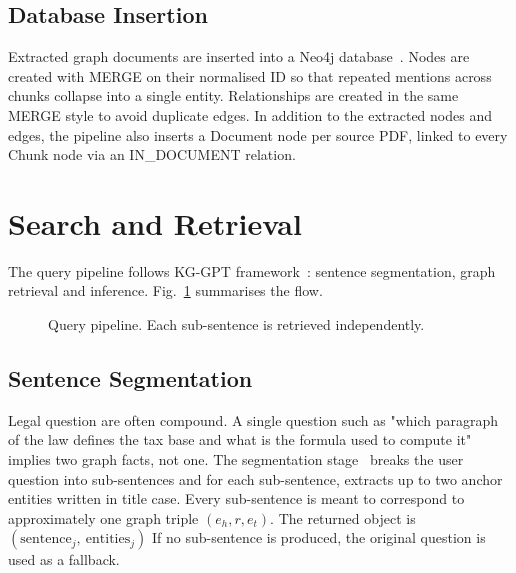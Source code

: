 \documentclass[conference]{IEEEtran}
\begin{document}
\subsection{Database Insertion}
Extracted graph documents are inserted into a {Neo4j database}~\cite{b3}. Nodes are created with MERGE on their normalised ID so that repeated mentions across chunks collapse into a single entity. Relationships are created in the same MERGE style to avoid duplicate edges. In addition to the extracted nodes and edges, the pipeline also inserts a Document node per source PDF, linked to every Chunk node via an IN\_DOCUMENT relation.

\section{Search and Retrieval}
The query pipeline follows {KG-GPT framework}~\cite{kggpt2023}: sentence segmentation, graph retrieval and inference. Fig.~\ref{fig:qeury} summarises the flow.

\begin{figure}[h]
\centering
  \caption{Query pipeline. Each sub-sentence is retrieved independently.}
\label{fig:qeury}
\end{figure}

\subsection{Sentence Segmentation}
Legal question are often compound. A single question such as "which paragraph of the law defines the tax base and what is the formula used to compute it" implies two graph facts, not one. The {segmentation stage}~\cite{sentenceSegmentation} breaks the user question into sub-sentences and for each sub-sentence, extracts up to two anchor entities written in title case. Every sub-sentence is meant to correspond to approximately one graph triple $(e_h, r, e_t)$. The returned object is $(\text{sentence}_j,\ \text{entities}_j)$ If no sub-sentence is produced, the original question is used as a fallback.
\end{document}
